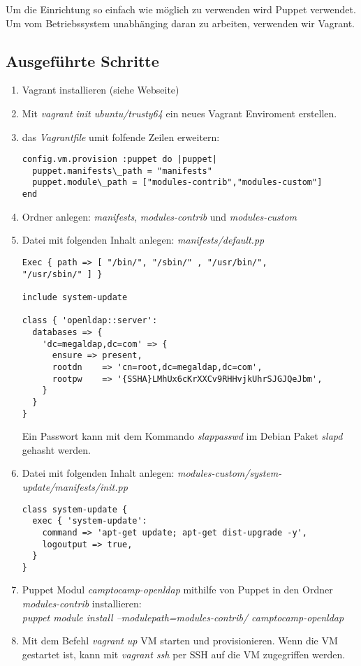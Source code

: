 \documentclass[main.tex]{subfiles}
\begin{document}
Um die Einrichtung so einfach wie möglich zu verwenden wird Puppet verwendet. Um vom Betriebssystem unabhänging daran zu arbeiten, verwenden wir Vagrant.

\subsection{Ausgeführte Schritte}
\begin{enumerate}
	\item Vagrant installieren (siehe Webseite)
	\item Mit \textit{vagrant init ubuntu/trusty64} ein neues Vagrant Enviroment erstellen.
	\item das \textit{Vagrantfile} umit folfende Zeilen erweitern: 
	\begin{lstlisting}
config.vm.provision :puppet do |puppet|
  puppet.manifests\_path = "manifests"
  puppet.module\_path = ["modules-contrib","modules-custom"]
end
	\end{lstlisting}
	\item Ordner anlegen: \textit{manifests}, \textit{modules-contrib} und \textit{modules-custom}
	\item Datei mit folgenden Inhalt anlegen: \textit{manifests/default.pp}
		\begin{lstlisting}
Exec { path => [ "/bin/", "/sbin/" , "/usr/bin/", 
"/usr/sbin/" ] }

include system-update

class { 'openldap::server':
  databases => {
    'dc=megaldap,dc=com' => {
      ensure => present,
      rootdn    => 'cn=root,dc=megaldap,dc=com',
      rootpw    => '{SSHA}LMhUx6cKrXXCv9RHHvjkUhrSJGJQeJbm',
    }
  }
}
		\end{lstlisting}
		Ein Passwort kann mit dem Kommando \textit{slappasswd} im Debian Paket \textit{slapd} gehasht werden.
		\item Datei mit folgenden Inhalt anlegen:
		\textit{modules-custom/system-update/manifests/init.pp}
		\begin{lstlisting}
class system-update {
  exec { 'system-update':
    command => 'apt-get update; apt-get dist-upgrade -y',
    logoutput => true,
  }
}
		\end{lstlisting}
		\item Puppet Modul \textit{camptocamp-openldap} mithilfe von Puppet in den Ordner \textit{modules-contrib} installieren:\\ \textit{puppet module install --modulepath=modules-contrib/ camptocamp-openldap}
		\item Mit dem Befehl \textit{vagrant up} VM starten und provisionieren. Wenn die VM gestartet ist, kann mit \textit{vagrant ssh} per SSH auf die VM zugegriffen werden.
\end{enumerate}
\end{document}
